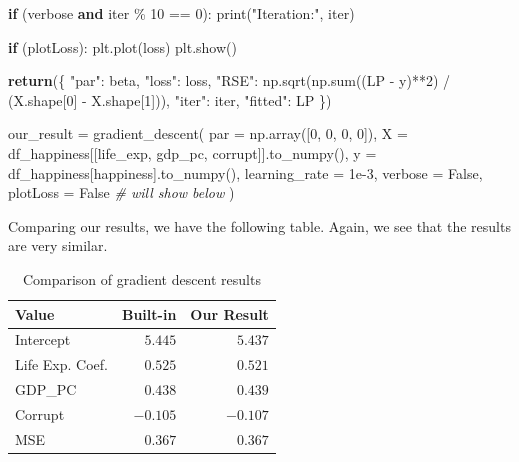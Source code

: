 \documentclass[
  letterpaper,
]{krantz}
\newenvironment{Shaded}{}{}
\newcommand{\BuiltInTok}[1]{\textcolor[rgb]{0.00,0.50,0.00}{#1}}
\newcommand{\CommentTok}[1]{\textcolor[rgb]{0.38,0.63,0.69}{\textit{#1}}}
\newcommand{\ControlFlowTok}[1]{\textcolor[rgb]{0.00,0.44,0.13}{\textbf{#1}}}
\newcommand{\DecValTok}[1]{\textcolor[rgb]{0.25,0.63,0.44}{#1}}
\newcommand{\FloatTok}[1]{\textcolor[rgb]{0.25,0.63,0.44}{#1}}
\newcommand{\KeywordTok}[1]{\textcolor[rgb]{0.00,0.44,0.13}{\textbf{#1}}}
\newcommand{\NormalTok}[1]{#1}
\newcommand{\OperatorTok}[1]{\textcolor[rgb]{0.40,0.40,0.40}{#1}}
\newcommand{\StringTok}[1]{\textcolor[rgb]{0.25,0.44,0.63}{#1}}
\newcommand{\VariableTok}[1]{\textcolor[rgb]{0.10,0.09,0.49}{#1}}
\begin{document}
\begin{Shaded}
\begin{Highlighting}[]
        \ControlFlowTok{if}\NormalTok{ (verbose }\KeywordTok{and} \BuiltInTok{iter} \OperatorTok{\%} \DecValTok{10} \OperatorTok{==} \DecValTok{0}\NormalTok{):}
            \BuiltInTok{print}\NormalTok{(}\StringTok{"Iteration:"}\NormalTok{, }\BuiltInTok{iter}\NormalTok{)}

    \ControlFlowTok{if}\NormalTok{ (plotLoss):}
\NormalTok{        plt.plot(loss)}
\NormalTok{        plt.show()}

    \ControlFlowTok{return}\NormalTok{(\{}
        \StringTok{"par"}\NormalTok{: beta,}
        \StringTok{"loss"}\NormalTok{: loss,}
        \StringTok{"RSE"}\NormalTok{: np.sqrt(np.}\BuiltInTok{sum}\NormalTok{((LP }\OperatorTok{{-}}\NormalTok{ y)}\OperatorTok{**}\DecValTok{2}\NormalTok{) }\OperatorTok{/}\NormalTok{ (X.shape[}\DecValTok{0}\NormalTok{] }\OperatorTok{{-}}\NormalTok{ X.shape[}\DecValTok{1}\NormalTok{])),}
        \StringTok{"iter"}\NormalTok{: }\BuiltInTok{iter}\NormalTok{,}
        \StringTok{"fitted"}\NormalTok{: LP}
\NormalTok{    \})}

\NormalTok{our\_result }\OperatorTok{=}\NormalTok{ gradient\_descent(}
\NormalTok{    par }\OperatorTok{=}\NormalTok{ np.array([}\DecValTok{0}\NormalTok{, }\DecValTok{0}\NormalTok{, }\DecValTok{0}\NormalTok{, }\DecValTok{0}\NormalTok{]),}
\NormalTok{    X }\OperatorTok{=}\NormalTok{ df\_happiness[[}\StringTok{\textquotesingle{}life\_exp\textquotesingle{}}\NormalTok{, }\StringTok{\textquotesingle{}gdp\_pc\textquotesingle{}}\NormalTok{, }\StringTok{\textquotesingle{}corrupt\textquotesingle{}}\NormalTok{]].to\_numpy(),}
\NormalTok{    y }\OperatorTok{=}\NormalTok{ df\_happiness[}\StringTok{\textquotesingle{}happiness\textquotesingle{}}\NormalTok{].to\_numpy(),}
\NormalTok{    learning\_rate }\OperatorTok{=} \FloatTok{1e{-}3}\NormalTok{,}
\NormalTok{    verbose  }\OperatorTok{=} \VariableTok{False}\NormalTok{,}
\NormalTok{    plotLoss }\OperatorTok{=} \VariableTok{False} \CommentTok{\# will show below}
\NormalTok{)}
\end{Highlighting}
\end{Shaded}

Comparing our results, we have the following table. Again, we see that
the results are very similar.

\hypertarget{tbl-gradient-descent}{}
\begin{longtable}{lrr}
\caption{\label{tbl-gradient-descent}Comparison of gradient descent results }\tabularnewline

\toprule
Value & Built-in & Our Result \\ 
\midrule
Intercept & $5.445$ & $5.437$ \\ 
Life Exp. Coef. & $0.525$ & $0.521$ \\ 
GDP\_PC & $0.438$ & $0.439$ \\ 
Corrupt & $-0.105$ & $-0.107$ \\ 
MSE & $0.367$ & $0.367$ \\ 
\bottomrule
\end{longtable}
\end{document}
